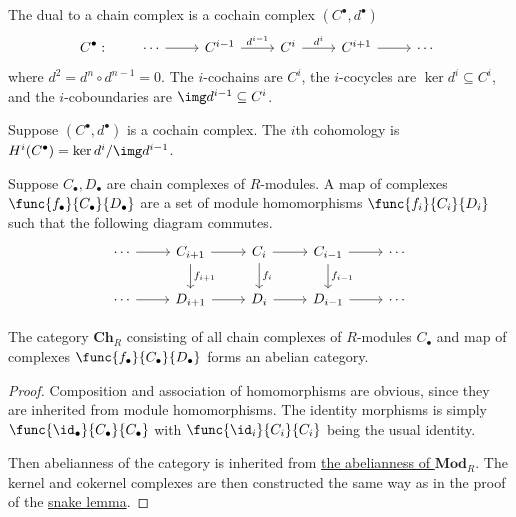 \begin{definition}
    The dual to a chain complex is a cochain complex \((C^\bullet,d^\bullet)\)
    \begin{equation*}
        C^\bullet: \qquad
        \begin{tikzcd}
            \cdots \arrow{r} & C^{i-1} \arrow{r}{d^{i-1}} &
            C^i \arrow{r}{d^i} & C^{i+1} \arrow{r} & \cdots
        \end{tikzcd}
    \end{equation*}
    where \(d^2 = d^n \circ d^{n-1} = 0\).
    The \(i\)-cochains are \(C^i\),
    the \(i\)-cocycles are \(\ker d^i \subseteq C^i\),
    and the \(i\)-coboundaries are \(\img d^{i-1} \subseteq C^i\).
\end{definition}
\begin{definition}
    Suppose \((C^\bullet,d^\bullet)\) is a cochain complex.
    The \(i\)th cohomology is \(H^i(C^\bullet) = \ker d^i/\img d^{i-1}\).
\end{definition}

\begin{definition}
    Suppose \(C_\bullet,D_\bullet\) are chain complexes of \(R\)-modules.
    A map of complexes \(\func{f_\bullet}{C_\bullet}{D_\bullet}\)
    are a set of module homomorphisms \(\func{f_i}{C_i}{D_i}\)
    such that the following diagram commutes.
    \begin{equation*}
        \begin{tikzcd}
            \cdots \arrow{r} & C_{i+1} \arrow{r} \arrow{d}{f_{i+1}} &
            C_i \arrow{r} \arrow{d}{f_i} & C_{i-1} \arrow{r} \arrow{d}{f_{i-1}} & \cdots \\
            \cdots \arrow{r} & D_{i+1} \arrow{r} & D_i \arrow{r} & D_{i-1} \arrow{r} & \cdots
        \end{tikzcd}
    \end{equation*}
\end{definition}

\begin{proposition}
    The category \(\textbf{Ch}_R\) consisting of all chain complexes of \(R\)-modules \(C_\bullet\)
    and map of complexes \(\func{f_\bullet}{C_\bullet}{D_\bullet}\) forms an abelian category.
\end{proposition}
\begin{proof}
    Composition and association of homomorphisms are obvious,
    since they are inherited from module homomorphisms.
    The identity morphisms is simply \(\func{\id_\bullet}{C_\bullet}{C_\bullet}\)
    with \(\func{\id_i}{C_i}{C_i}\) being the usual identity.

    Then abelianness of the category is inherited from
    \hyperref[prop:module-ab-cat]{the abelianness of \(\textbf{Mod}_R\)}.
    The kernel and cokernel complexes are then constructed the same way
    as in the proof of the \hyperref[lem:snake]{snake lemma}.
\end{proof}

